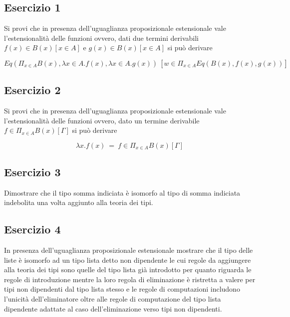\subsection{Esercizio 1}
\begin{thm}
	Si provi che in presenza dell’uguaglianza proposizionale estensionale vale l’estensionalità delle funzioni ovvero, dati due termini derivabili $f(x)\in B(x) [x\in A]$ e $g(x)\in B(x) [x\in A]$ si può	derivare
	
	\[ Eq(\Pi_{x\in A}B(x), \lambda x\in A.f(x), \lambda x\in A.g(x))~[w\in \Pi_{x\in A}Eq(B(x), f(x), g(x))]\]
\end{thm}


\subsection{Esercizio 2}
\begin{thm}
	Si provi che in presenza dell’uguaglianza proposizionale estensionale vale l’estensionalità delle funzioni ovvero, dato un termine derivabile $f\in\Pi_{x\in A} B(x) [\Gamma]$ si può derivare
	
	\[ \lambda x.f(x)~=~f\in\Pi_{x\in A} B(x) [\Gamma] \]
\end{thm}


\subsection{Esercizio 3}
\begin{thm}
	Dimostrare che il tipo somma indiciata è isomorfo al tipo di somma indiciata indebolita una volta aggiunto alla teoria dei tipi.
\end{thm}


\subsection{Esercizio 4}
\begin{thm}
	In presenza dell’uguaglianza proposizionale estensionale mostrare che il tipo delle liste è isomorfo ad un tipo lista detto non dipendente le cui regole da aggiungere alla teoria dei tipi sono quelle del	tipo lista già introdotto per quanto riguarda le regole di introduzione mentre la loro regola di eliminazione è ristretta a valere per tipi non dipendenti dal tipo lista stesso e le regole di computazioni includono l’unicità dell’eliminatore oltre alle regole di computazione del tipo lista dipendente adattate al caso dell’eliminazione verso tipi non dipendenti.
\end{thm}


